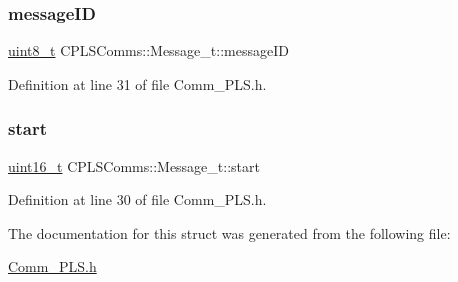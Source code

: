 \subsubsection{\texorpdfstring{message\+ID}{messageID}}
{\footnotesize\ttfamily \mbox{\hyperlink{_a_d_a_s___types_8h_aba7bc1797add20fe3efdf37ced1182c5}{uint8\+\_\+t}} C\+P\+L\+S\+Comms\+::\+Message\+\_\+t\+::message\+ID}



Definition at line 31 of file Comm\+\_\+\+P\+L\+S.\+h.

\mbox{\label{struct_c_p_l_s_comms_1_1_message__t_a760e6f39adfed2b0440477560654f02f}} 
\subsubsection{\texorpdfstring{start}{start}}
{\footnotesize\ttfamily \mbox{\hyperlink{_a_d_a_s___types_8h_a1f1825b69244eb3ad2c7165ddc99c956}{uint16\+\_\+t}} C\+P\+L\+S\+Comms\+::\+Message\+\_\+t\+::start}



Definition at line 30 of file Comm\+\_\+\+P\+L\+S.\+h.



The documentation for this struct was generated from the following file\+:\begin{DoxyCompactItemize}
\item 
\mbox{\hyperlink{_comm___p_l_s_8h}{Comm\+\_\+\+P\+L\+S.\+h}}\end{DoxyCompactItemize}
